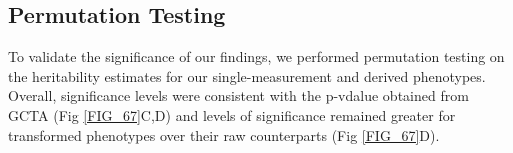 \subsection*{Permutation Testing}

To validate the significance of our findings, we performed permutation testing on the heritability estimates for our single-measurement and derived phenotypes. Overall, significance levels were consistent with the p-vdalue obtained from GCTA (Fig \ref{FIG_67}C,D) and levels of significance remained greater for transformed phenotypes over their raw counterparts (Fig \ref{FIG_67}D).














